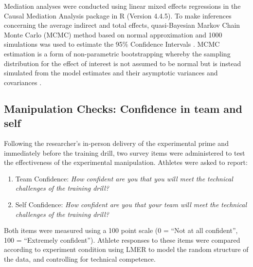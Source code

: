 \begin{CJK}{UTF8}{gbsn}
Mediation analyses were conducted using linear mixed effects regressions in the Causal Mediation Analysis package in R (Version 4.4.5).  To make inferences concerning the average indirect and total effects, quasi-Bayesian Markov Chain Monte Carlo (MCMC) method based on normal approximation and 1000 simulations was used to estimate the 95\% Confidence Intervals \citep{Tofighi2016a,Imai2010}. MCMC estimation is a form of non-parametric bootstrapping whereby the sampling distribution for the effect of interest is not assumed to be normal but is instead simulated from the model estimates and their asymptotic variances and covariances \citep{Preacher2008}.



\subsection{Manipulation Checks: Confidence in team and self \label{sec:manChecksDrill}}
Following the researcher's in-person delivery of the experimental prime and immediately before the training drill, two survey items were administered to test the effectiveness of the experimental manipulation.  Athletes were asked to report:

\begin{enumerate}
  \item Team Confidence: \textit{How confident are you that you will meet the technical challenges of the training drill?}
  \item Self Confidence: \textit{How confident are you that your team will meet the technical challenges of the training drill?}
\end{enumerate}

Both items were measured using a 100 point scale (0 = ``Not at all confident'', 100 = ``Extremely confident'').  Athlete responses to these items were compared according to experiment condition using LMER to model the random structure of the data, and controlling for technical competence.



































\end{CJK}
